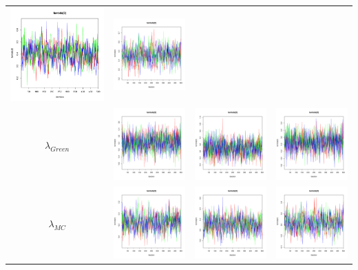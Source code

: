 \documentclass[letter,12pt]{article}
\begin{document}
\begin{table}
\begin{tabular}{cccc}
                        \includegraphics[width=.15\columnwidth]{../graphs/traceplots/2015d0vbar_3.pdf} &
                         \includegraphics[width=.15\columnwidth]{../graphs/traceplots/2015d0wbar_3.pdf} \\
    $\lambda_{Green}$  & \includegraphics[width=.15\columnwidth]{../graphs/traceplots/2015d0v_4.pdf} &
                        \includegraphics[width=.15\columnwidth]{../graphs/traceplots/2015d0vbar_4.pdf} &
                         \includegraphics[width=.15\columnwidth]{../graphs/traceplots/2015d0wbar_4.pdf} \\
    $\lambda_{MC}$    & \includegraphics[width=.15\columnwidth]{../graphs/traceplots/2015d0v_5.pdf} &
                        \includegraphics[width=.15\columnwidth]{../graphs/traceplots/2015d0vbar_5.pdf} &
                         \includegraphics[width=.15\columnwidth]{../graphs/traceplots/2015d0wbar_5.pdf} \\

\end{tabular}
\end{table}
\end{document}
